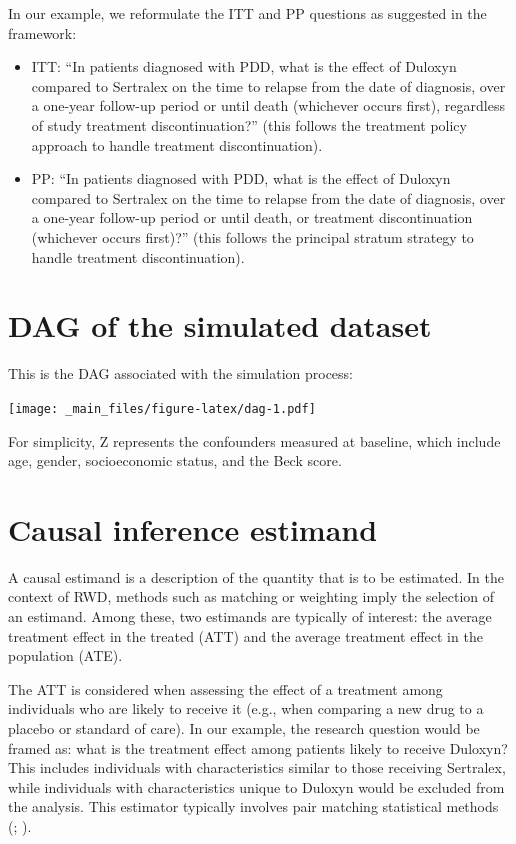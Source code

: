 \documentclass[
]{book}
\begin{document}
In our example, we reformulate the ITT and PP questions as suggested in
the framework:

\begin{itemize}
\item
  ITT: ``In patients diagnosed with PDD, what is the effect of Duloxyn
  compared to Sertralex on the time to relapse from the date of
  diagnosis, over a one-year follow-up period or until death (whichever
  occurs first), regardless of study treatment discontinuation?'' (this
  follows the treatment policy approach to handle treatment
  discontinuation).
\item
  PP: ``In patients diagnosed with PDD, what is the effect of Duloxyn
  compared to Sertralex on the time to relapse from the date of
  diagnosis, over a one-year follow-up period or until death, or
  treatment discontinuation (whichever occurs first)?'' (this follows
  the principal stratum strategy to handle treatment discontinuation).
\end{itemize}

\chapter{DAG of the simulated dataset}\label{dag}

This is the DAG associated with the simulation process:

\texttt{[image: \_main\_files/figure-latex/dag-1.pdf]}

For simplicity, Z represents the confounders measured at baseline, which
include age, gender, socioeconomic status, and the Beck score.

\chapter{Causal inference estimand}\label{causal}

A causal estimand is a description of the quantity that is to be
estimated. In the context of RWD, methods such as matching or weighting
imply the selection of an estimand. Among these, two estimands are
typically of interest: the average treatment effect in the treated (ATT)
and the average treatment effect in the population (ATE).

The ATT is considered when assessing the effect of a treatment among
individuals who are likely to receive it (e.g., when comparing a new
drug to a placebo or standard of care). In our example, the research
question would be framed as: what is the treatment effect among patients
likely to receive Duloxyn? This includes individuals with
characteristics similar to those receiving Sertralex, while individuals
with characteristics unique to Duloxyn would be excluded from the
analysis. This estimator typically involves pair matching statistical
methods (;
).

\backmatter
\end{document}
